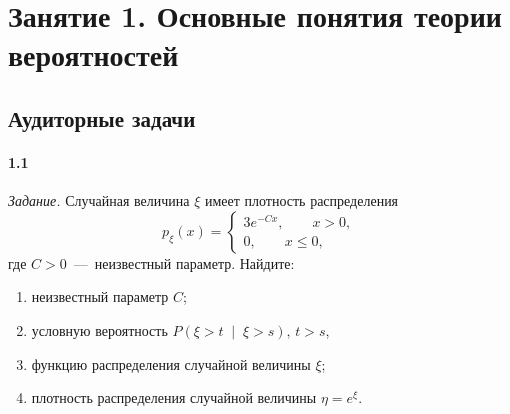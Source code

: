 \chapter*{Занятие 1. Основные понятия теории вероятностей}

\section*{Аудиторные задачи}

\subsubsection*{1.1}

\textit{Задание.}
Случайная величина $ \xi $ имеет плотность распределения
\begin{equation*}
  p_{ \xi } \left( x \right) =
  \begin{cases}
    3e^{-Cx}, \qquad x > 0, \\
    0, \qquad x \leq 0,
  \end{cases}
\end{equation*}
где $C > 0$~---~неизвестный параметр.
Найдите:
\begin{enumerate}[label=\alph*)]
  \item неизвестный параметр $C$;
  \item условную вероятность
  $P \left( \xi > t \; \middle| \; \xi > s \right), \, t > s$,
  \item функцию распределения случайной величины $ \xi $;
  \item плотность распределения случайной величины $ \eta = e^{ \xi }$.
\end{enumerate}

